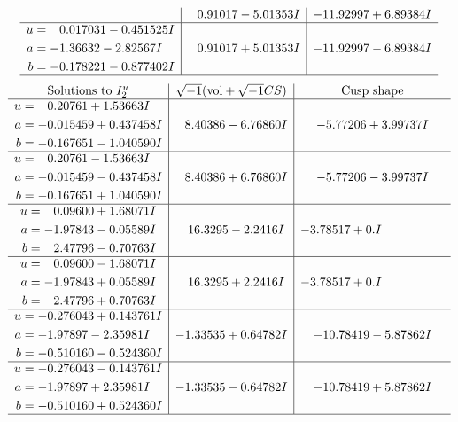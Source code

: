 \documentclass[1p]{elsarticle_modified}
\theoremstyle{definition}
\newcommand{\I}{\sqrt{-1}}
\begin{document}
$$\begin{array}{c|c|c}
 & \phantom{-}0.91017 - 5.01353 I & -11.92997 + 6.89384 I \\ \hline\begin{aligned}
u &= \phantom{-}0.017031 - 0.451525 I \\
a &= -1.36632 - 2.82567 I \\
b &= -0.178221 - 0.877402 I\end{aligned}
 & \phantom{-}0.91017 + 5.01353 I & -11.92997 - 6.89384 I\\
 \hline 
 \end{array}$$\newpage$$\begin{array}{c|c|c}  
\text{Solutions to }I^u_{2}& \I (\text{vol} + \sqrt{-1}CS) & \text{Cusp shape}\\
 \hline 
\begin{aligned}
u &= \phantom{-}0.20761 + 1.53663 I \\
a &= -0.015459 + 0.437458 I \\
b &= -0.167651 - 1.040590 I\end{aligned}
 & \phantom{-}8.40386 - 6.76860 I & -5.77206 + 3.99737 I \\ \hline\begin{aligned}
u &= \phantom{-}0.20761 - 1.53663 I \\
a &= -0.015459 - 0.437458 I \\
b &= -0.167651 + 1.040590 I\end{aligned}
 & \phantom{-}8.40386 + 6.76860 I & -5.77206 - 3.99737 I \\ \hline\begin{aligned}
u &= \phantom{-}0.09600 + 1.68071 I \\
a &= -1.97843 - 0.05589 I \\
b &= \phantom{-}2.47796 - 0.70763 I\end{aligned}
 & \phantom{-}16.3295 - 2.2416 I & -3.78517 + 0. I\phantom{ +0.000000I} \\ \hline\begin{aligned}
u &= \phantom{-}0.09600 - 1.68071 I \\
a &= -1.97843 + 0.05589 I \\
b &= \phantom{-}2.47796 + 0.70763 I\end{aligned}
 & \phantom{-}16.3295 + 2.2416 I & -3.78517 + 0. I\phantom{ +0.000000I} \\ \hline\begin{aligned}
u &= -0.276043 + 0.143761 I \\
a &= -1.97897 - 2.35981 I \\
b &= -0.510160 - 0.524360 I\end{aligned}
 & -1.33535 + 0.64782 I & -10.78419 - 5.87862 I \\ \hline\begin{aligned}
u &= -0.276043 - 0.143761 I \\
a &= -1.97897 + 2.35981 I \\
b &= -0.510160 + 0.524360 I\end{aligned}
 & -1.33535 - 0.64782 I & -10.78419 + 5.87862 I\\
 \hline 
 \end{array}$$\newpage
\end{document}
